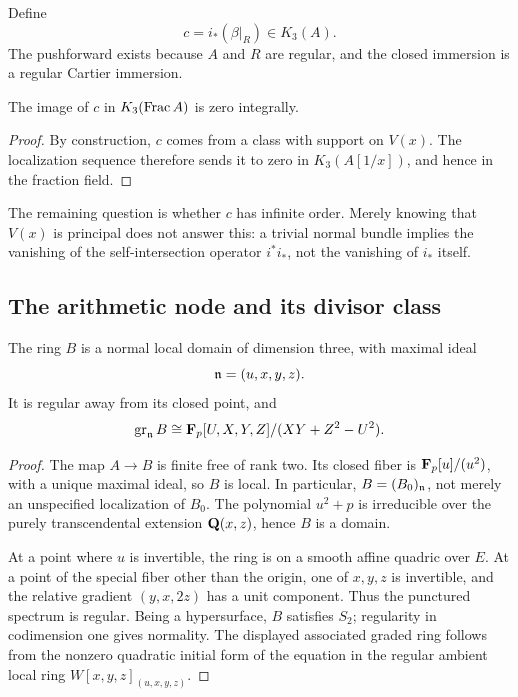 Define
\begin{equation}\label{d3:eq:c}
c=i_*(\beta|_R)\in K_3(A).
\end{equation}
The pushforward exists because $A$ and $R$ are regular, and the closed immersion is a regular Cartier immersion.

\begin{lemma}\label{d3:lem:genericzero}
The image of $c$ in $K_3(\operatorname{Frac} A)$ is zero integrally.
\end{lemma}
\begin{proof}
By construction, $c$ comes from a class with support on $V(x)$. The localization sequence therefore sends it to zero in $K_3(A[1/x])$, and hence in the fraction field.
\end{proof}

The remaining question is whether $c$ has infinite order. Merely knowing that $V(x)$ is principal does not answer this: a trivial normal bundle implies the vanishing of the self-intersection operator $i^*i_*$, not the vanishing of $i_*$ itself.

\subsection{The arithmetic node and its divisor class}\label{d3:sec:node}

\begin{lemma}\label{d3:lem:normalB}
The ring $B$ is a normal local domain of dimension three, with maximal ideal
\[
\mathfrak n=(u,x,y,z).
\]
It is regular away from its closed point, and
\[
\operatorname{gr}_{\mathfrak n}B
\cong\mathbf F_p[U,X,Y,Z]/(XY+Z^2-U^2).
\]
\end{lemma}
\begin{proof}
The map $A\to B$ is finite free of rank two. Its closed fiber is $\mathbf F_p[u]/(u^2)$, with a unique maximal ideal, so $B$ is local. In particular, $B=(B_0)_{\mathfrak n}$, not merely an unspecified localization of $B_0$. The polynomial $u^2+p$ is irreducible over the purely transcendental extension $\mathbf Q(x,z)$, hence $B$ is a domain.

At a point where $u$ is invertible, the ring is on a smooth affine quadric over $E$. At a point of the special fiber other than the origin, one of $x,y,z$ is invertible, and the relative gradient $(y,x,2z)$ has a unit component. Thus the punctured spectrum is regular. Being a hypersurface, $B$ satisfies $S_2$; regularity in codimension one gives normality. The displayed associated graded ring follows from the nonzero quadratic initial form of the equation in the regular ambient local ring $W[x,y,z]_{(u,x,y,z)}$.
\end{proof}

